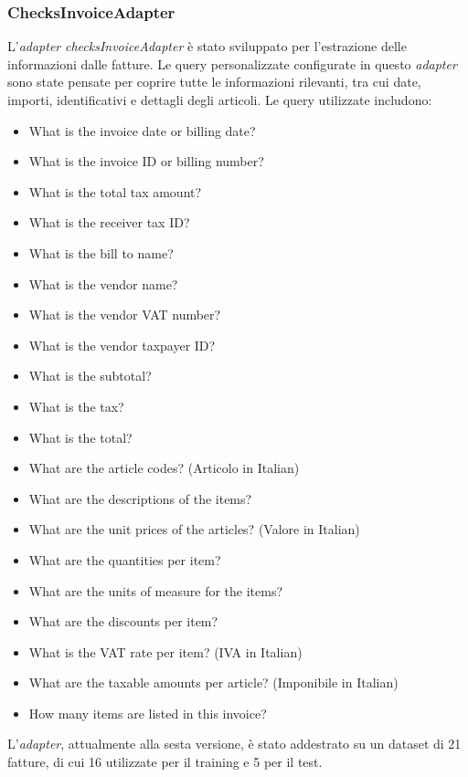 \subsubsection{ChecksInvoiceAdapter}
L'\textit{adapter} \textit{checksInvoiceAdapter} è stato sviluppato per l'estrazione delle informazioni dalle fatture. Le query personalizzate configurate in questo \textit{adapter} sono state pensate per coprire tutte le informazioni rilevanti, tra cui date, importi, identificativi e dettagli degli articoli. Le query utilizzate includono:

\begin{itemize}
    \item What is the invoice date or billing date?
    \item What is the invoice ID or billing number?
    \item What is the total tax amount?
    \item What is the receiver tax ID?
    \item What is the bill to name?
    \item What is the vendor name?
    \item What is the vendor VAT number?
    \item What is the vendor taxpayer ID?
    \item What is the subtotal?
    \item What is the tax?
    \item What is the total?
    \item What are the article codes? (Articolo in Italian)
    \item What are the descriptions of the items?
    \item What are the unit prices of the articles? (Valore in Italian)
    \item What are the quantities per item?
    \item What are the units of measure for the items?
    \item What are the discounts per item?
    \item What is the VAT rate per item? (IVA in Italian)
    \item What are the taxable amounts per article? (Imponibile in Italian)
    \item How many items are listed in this invoice?
\end{itemize}

L'\textit{adapter}, attualmente alla sesta versione, è stato addestrato su un dataset di 21 fatture, di cui 16 utilizzate per il training e 5 per il test.

